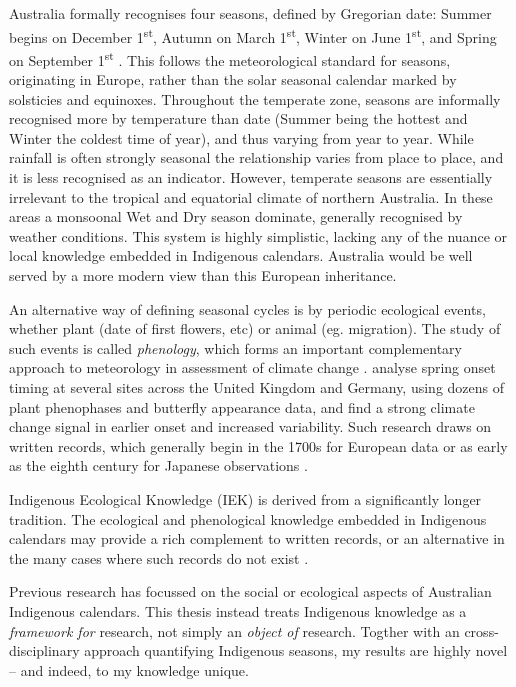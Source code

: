 Australia formally recognises four seasons, defined by Gregorian date:
Summer begins on December 1\textsuperscript{st}, Autumn on March
1\textsuperscript{st}, Winter on June 1\textsuperscript{st}, and Spring
on September 1\textsuperscript{st} \citep{wells2013}. This follows the
meteorological standard for seasons, originating in Europe, rather
than the solar seasonal calendar marked by solsticies and equinoxes.
%
Throughout the temperate zone, seasons are informally recognised more by
temperature than date (Summer being the hottest and Winter the coldest time
of year), and thus varying from year to year.  While rainfall is often
strongly  seasonal the relationship varies from place to place, and it is
less recognised as an indicator.
%
However, temperate seasons are essentially irrelevant to the tropical and
equatorial climate of northern Australia.  In these areas a monsoonal Wet
and Dry season dominate, generally recognised by weather conditions.
This system is highly simplistic, lacking any of the nuance or local
knowledge embedded in Indigenous calendars.  Australia would be well
served by a more modern view than this European inheritance.


An alternative way of defining seasonal cycles is by periodic ecological
events, whether plant (date of first flowers, etc) or animal (eg. migration).
The study of such events is called \textit{phenology}, which forms an
important complementary approach to meteorology in assessment of climate
change \citep[eg.][]{roy2000}.  \citet{menzel2006} analyse spring onset timing
at several sites across the United Kingdom and Germany, using dozens of
plant phenophases and butterfly appearance data, and find a strong climate
change signal in earlier onset and increased variability.  Such research
draws on written records, which generally begin in the 1700s for European
data or as early as the eighth century for Japanese observations \citep{sparks2002}.

Indigenous Ecological Knowledge (IEK) is derived from a significantly longer
tradition.  The ecological and phenological knowledge embedded
in Indigenous calendars may provide a rich complement to written records,
or an alternative in the many cases where such records do not exist .








Previous research  has focussed on the social or ecological aspects of Australian
Indigenous calendars.  This thesis instead treats Indigenous knowledge as a
\emph{framework for} research, not simply an \emph{object of} research.
Togther with an cross-disciplinary approach quantifying Indigenous seasons,
my results are highly novel -- and indeed, to my knowledge unique.




